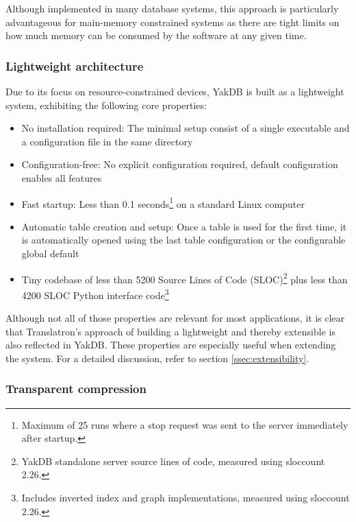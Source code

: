 \documentclass[a4paper, 12pt, twoside, reqn]{report}
\numberwithin{figure}{chapter}
\newtheorem[L]{boxedDefinition}{Definition}
\newtheorem[L]{boxedExample}{Example}
\begin{document}
Although implemented in many database systems, this approach is particularly advantageous for main-memory constrained systems as there are tight limits on how much memory can be consumed by the software at any given time.

\afterpage{\clearpage}

\subsubsection{Lightweight architecture}\label{sssec:lightweight-architecture}

Due to its focus on resource-constrained devices, YakDB is built as a lightweight system, exhibiting the following core properties:

\begin{itemize}
 \item No installation required: The minimal setup consist of a single executable and a configuration file in the same directory
 \item Configuration-free: No explicit configuration required, default configuration enables all features
 \item Fast startup: Less than 0.1 seconds\footnote{Maximum of 25 runs where a stop request was sent to the server immediately after startup.} on a standard Linux computer
 \item Automatic table creation and setup: Once a table is used for the first time, it is automatically opened using the last table configuration or the configurable global default
 \item Tiny codebase of less than 5200 Source Lines of Code (SLOC)\footnote{YakDB standalone server source lines of code, measured using sloccount 2.26.} plus less than 4200 SLOC Python interface code\footnote{Includes inverted index and graph implementations, measured using sloccount 2.26.}
\end{itemize}

Although not all of those properties are relevant for most applications, it is clear that Translatron's approach of building a lightweight and thereby extensible is also reflected in YakDB. These properties are especially useful when extending the system. For a detailed discussion, refer to section \ref{ssec:extensibility}.

\subsubsection{Transparent compression}
\end{document}

